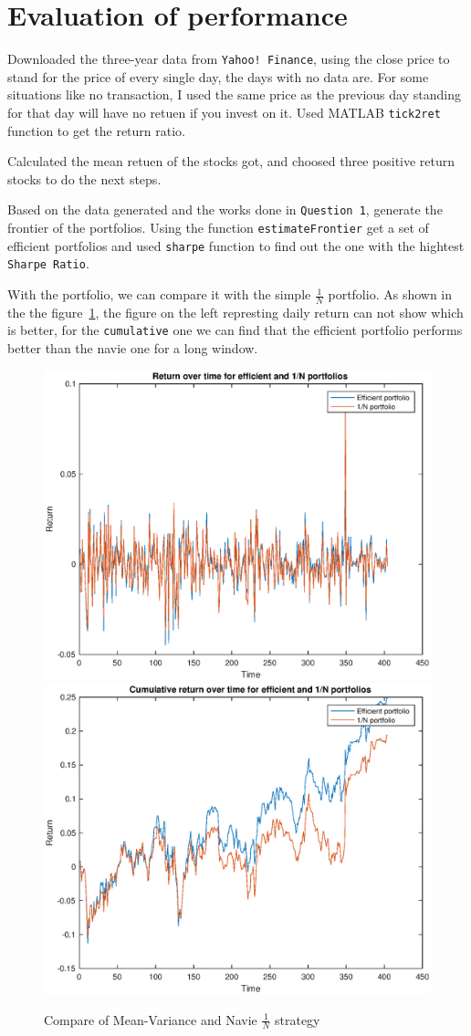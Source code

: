 \documentclass[a4paper, 12pt]{article}
\begin{document}
	\section{Evaluation of performance}
	
	Downloaded the three-year data from \texttt{Yahoo! Finance}, using the close price to stand for the price of every single day, the days with no data are. For some situations like no transaction, I used the same price as the previous day standing for that day will have no retuen if you invest on it. Used MATLAB \texttt{tick2ret} function to get the return ratio.
	
	Calculated the mean retuen of the stocks got, and choosed three positive return stocks to do the next steps.
	
	Based on the data generated and the works done in \texttt{Question 1}, generate the frontier of the portfolios. Using the function \texttt{estimateFrontier} get a set of efficient portfolios and used \texttt{sharpe} function to find out the one with the hightest \texttt{Sharpe Ratio}.
	
	With the portfolio, we can compare it with the simple $\frac{1}{N}$ portfolio. As shown in the the figure~\ref{fig:q2}, the figure on the left represting daily return can not show which is better, for the \texttt{cumulative} one we can find that the efficient portfolio performs better than the navie one for a long window.
	\begin{figure}
		\begin{center}
       		\includegraphics[width=0.45\linewidth]{stock_price/q2_1.eps}
       		\includegraphics[width=0.45\linewidth]{stock_price/q2_2.eps}
		\end{center}
		\caption{Compare of Mean-Variance and Navie $\frac{1}{N}$ strategy}
   		\label{fig:q2}
	\end{figure}
	
\end{document}
